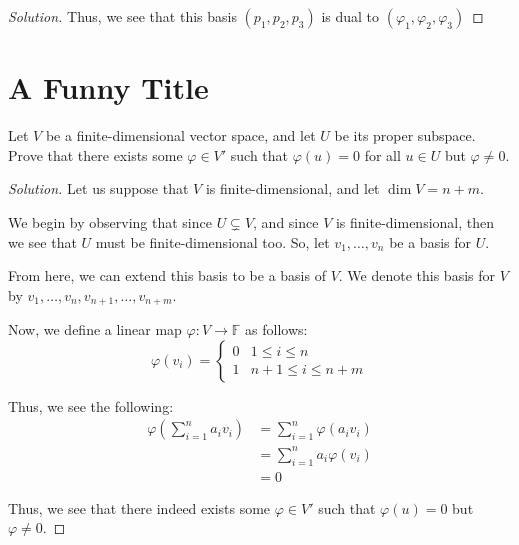\documentclass{article}
\newenvironment{solution}{\begin{proof}[Solution]}{\end{proof}}
\begin{document}
\begin{solution}
		Thus, we see that this basis $(p_{1}, p_{2}, p_{3})$ is dual to $(\varphi_{1}, \varphi_{2}, \varphi_3)$
	\end{solution}
	
	\newpage
	
	\section{A Funny Title}
	\begin{hw}
		Let $V$ be a finite-dimensional vector space, and let $U$ be its proper subspace. Prove that there exists some $\varphi \in V'$ such that $\varphi(u) = 0$ for all $u \in U$ but $\varphi \neq 0$.
	\end{hw}
	\begin{solution}
		Let us suppose that $V$ is finite-dimensional, and let $\dim V = n + m$.
		
		We begin by observing that since $U \subsetneq V$, and since $V$ is finite-dimensional, then we see that $U$ must be finite-dimensional too. So, let $v_{1}, \ldots, v_{n}$ be a basis for $U$.
		
		From here, we can extend this basis to be a basis of $V$. We denote this basis for $V$ by $v_{1}, \ldots, v_{n}, v_{n+1}, \ldots, v_{n+m}$.
		
		Now, we define a linear map $\varphi : V \rightarrow \mathbb{F}$ as follows:
		\begin{equation*}
			\varphi(v_{i}) =
			\begin{cases}
				0 & 1 \leq i \leq n \\
				1 & n+1 \leq i \leq n+m
			\end{cases}
		\end{equation*}
	
		Thus, we see the following:
		\begin{align*}
			\varphi\left( \sum_{i=1}^{n} a_{i}v_{i} \right) &= \sum_{i=1}^{n} \varphi(a_{i} v_{i}) \\
			&= \sum_{i=1}^{n} a_{i}\varphi(v_{i}) \\
			&= 0
		\end{align*}
	
		Thus, we see that there indeed exists some $\varphi \in V'$ such that $\varphi(u) = 0$ but $\varphi \neq 0$.
	\end{solution}
\end{document}
